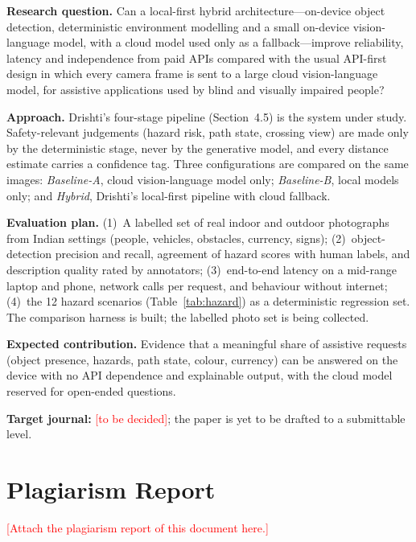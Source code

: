 \documentclass[12pt,singleside,a4paper]{article}
\newcommand{\tbd}[1]{\textcolor{red}{[#1]}}
\begin{document}
\textbf{Research question.} Can a local-first hybrid architecture---on-device object detection, deterministic environment modelling and a small on-device vision-language model, with a cloud model used only as a fallback---improve reliability, latency and independence from paid APIs compared with the usual API-first design in which every camera frame is sent to a large cloud vision-language model, for assistive applications used by blind and visually impaired people?

\textbf{Approach.} Drishti's four-stage pipeline (Section~4.5) is the system under study. Safety-relevant judgements (hazard risk, path state, crossing view) are made only by the deterministic stage, never by the generative model, and every distance estimate carries a confidence tag. Three configurations are compared on the same images: \emph{Baseline-A}, cloud vision-language model only; \emph{Baseline-B}, local models only; and \emph{Hybrid}, Drishti's local-first pipeline with cloud fallback.

\textbf{Evaluation plan.} (1)~A labelled set of real indoor and outdoor photographs from Indian settings (people, vehicles, obstacles, currency, signs); (2)~object-detection precision and recall, agreement of hazard scores with human labels, and description quality rated by annotators; (3)~end-to-end latency on a mid-range laptop and phone, network calls per request, and behaviour without internet; (4)~the 12 hazard scenarios (Table~\ref{tab:hazard}) as a deterministic regression set. The comparison harness is built; the labelled photo set is being collected.

\textbf{Expected contribution.} Evidence that a meaningful share of assistive requests (object presence, hazards, path state, colour, currency) can be answered on the device with no API dependence and explainable output, with the cloud model reserved for open-ended questions.

\textbf{Target journal:} \tbd{to be decided}; the paper is yet to be drafted to a submittable level.

\vspace{1cm}
\section{Plagiarism Report}
\tbd{Attach the plagiarism report of this document here.}
\pagebreak
\end{document}
